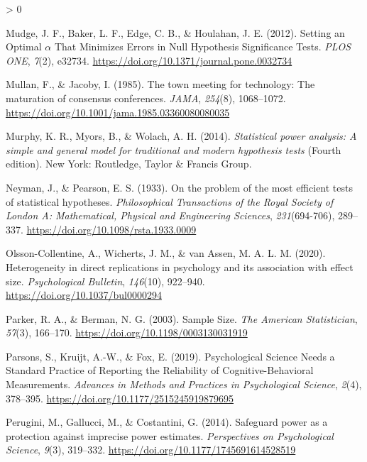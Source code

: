 \documentclass[
  english,
  ,jou,floatsintext]{apa6}
\newlength{\cslhangindent}
\newenvironment{CSLReferences}[2] %
 {%
  \setlength{\parindent}{0pt}
  \ifodd #1 \everypar{\setlength{\hangindent}{\cslhangindent}}\ignorespaces\fi
  \ifnum #2 > 0
  \setlength{\parskip}{#2\baselineskip}
  \fi
 }%
 {}
\begin{document}
\begin{CSLReferences}{1}{0}
\leavevmode\hypertarget{ref-mudge_setting_2012}{}%
Mudge, J. F., Baker, L. F., Edge, C. B., \& Houlahan, J. E. (2012). Setting an {Optimal} {\(\alpha\)} {That Minimizes Errors} in {Null Hypothesis Significance Tests}. \emph{PLOS ONE}, \emph{7}(2), e32734. \url{https://doi.org/10.1371/journal.pone.0032734}

\leavevmode\hypertarget{ref-mullan_town_1985}{}%
Mullan, F., \& Jacoby, I. (1985). The town meeting for technology: {The} maturation of consensus conferences. \emph{JAMA}, \emph{254}(8), 1068--1072. \url{https://doi.org/10.1001/jama.1985.03360080080035}

\leavevmode\hypertarget{ref-murphy_statistical_2014}{}%
Murphy, K. R., Myors, B., \& Wolach, A. H. (2014). \emph{Statistical power analysis: A simple and general model for traditional and modern hypothesis tests} (Fourth edition). {New York}: {Routledge, Taylor \& Francis Group}.

\leavevmode\hypertarget{ref-neyman_problem_1933}{}%
Neyman, J., \& Pearson, E. S. (1933). On the problem of the most efficient tests of statistical hypotheses. \emph{Philosophical Transactions of the Royal Society of London A: Mathematical, Physical and Engineering Sciences}, \emph{231}(694-706), 289--337. \url{https://doi.org/10.1098/rsta.1933.0009}

\leavevmode\hypertarget{ref-olsson-collentine_heterogeneity_2020}{}%
Olsson-Collentine, A., Wicherts, J. M., \& van Assen, M. A. L. M. (2020). Heterogeneity in direct replications in psychology and its association with effect size. \emph{Psychological Bulletin}, \emph{146}(10), 922--940. \url{https://doi.org/10.1037/bul0000294}

\leavevmode\hypertarget{ref-parker_sample_2003}{}%
Parker, R. A., \& Berman, N. G. (2003). Sample {Size}. \emph{The American Statistician}, \emph{57}(3), 166--170. \url{https://doi.org/10.1198/0003130031919}

\leavevmode\hypertarget{ref-parsons_psychological_2019}{}%
Parsons, S., Kruijt, A.-W., \& Fox, E. (2019). Psychological {Science Needs} a {Standard Practice} of {Reporting} the {Reliability} of {Cognitive-Behavioral Measurements}. \emph{Advances in Methods and Practices in Psychological Science}, \emph{2}(4), 378--395. \url{https://doi.org/10.1177/2515245919879695}

\leavevmode\hypertarget{ref-perugini_safeguard_2014}{}%
Perugini, M., Gallucci, M., \& Costantini, G. (2014). Safeguard power as a protection against imprecise power estimates. \emph{Perspectives on Psychological Science}, \emph{9}(3), 319--332. \url{https://doi.org/10.1177/1745691614528519}


\end{CSLReferences}
\end{document}

